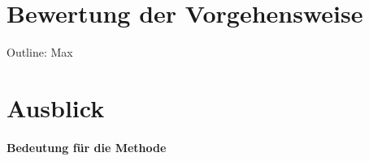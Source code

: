 \section{Bewertung der Vorgehensweise}
Outline: Max

\section{Ausblick}
\paragraph{Bedeutung für die Methode}


